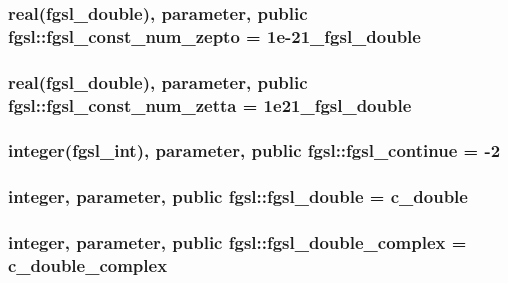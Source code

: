 \hypertarget{classfgsl_ac924f9358aa8ca1b7a72025328901e8e}{
\subsubsection[{fgsl\-\_\-const\-\_\-num\-\_\-zepto}]{\setlength{\rightskip}{0pt plus 5cm}real({\bf fgsl\-\_\-double}), parameter, public fgsl\-::fgsl\-\_\-const\-\_\-num\-\_\-zepto = 1e-\/21\-\_\-fgsl\-\_\-double}}\label{classfgsl_ac924f9358aa8ca1b7a72025328901e8e}
\hypertarget{classfgsl_adbd48c7f748a96cfbe32705159c06b84}{
\subsubsection[{fgsl\-\_\-const\-\_\-num\-\_\-zetta}]{\setlength{\rightskip}{0pt plus 5cm}real({\bf fgsl\-\_\-double}), parameter, public fgsl\-::fgsl\-\_\-const\-\_\-num\-\_\-zetta = 1e21\-\_\-fgsl\-\_\-double}}\label{classfgsl_adbd48c7f748a96cfbe32705159c06b84}
\hypertarget{classfgsl_adaee86adbad23b6853659f6564d6c46b}{
\subsubsection[{fgsl\-\_\-continue}]{\setlength{\rightskip}{0pt plus 5cm}integer({\bf fgsl\-\_\-int}), parameter, public fgsl\-::fgsl\-\_\-continue = -\/2}}\label{classfgsl_adaee86adbad23b6853659f6564d6c46b}
\hypertarget{classfgsl_a9af5113378e0f000eb479d3f90196ddf}{
\subsubsection[{fgsl\-\_\-double}]{\setlength{\rightskip}{0pt plus 5cm}integer, parameter, public fgsl\-::fgsl\-\_\-double = c\-\_\-double}}\label{classfgsl_a9af5113378e0f000eb479d3f90196ddf}
\hypertarget{classfgsl_a66d0fde3788cc0c300046f8fcd07d702}{
\subsubsection[{fgsl\-\_\-double\-\_\-complex}]{\setlength{\rightskip}{0pt plus 5cm}integer, parameter, public fgsl\-::fgsl\-\_\-double\-\_\-complex = c\-\_\-double\-\_\-complex}}\label{classfgsl_a66d0fde3788cc0c300046f8fcd07d702}
